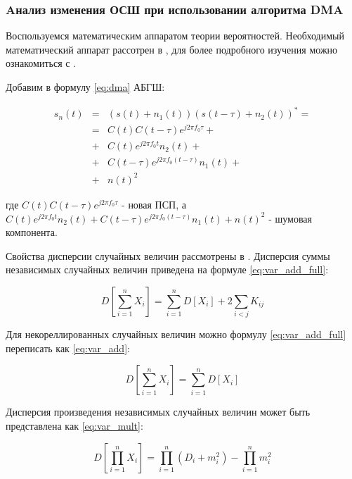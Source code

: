 \subsubsection{Aнализ изменения ОСШ при использовании алгоритма DMA}
\label{sssec:dma_noise}

Воспользуемся математическим аппаратом теории вероятностей. Необходимый математический аппарат
рассотрен в \cite{ventcel}, для более подробного изучения можно ознакомиться с \cite{feller}.

Добавим в формулу \ref{eq:dma} АБГШ:

\begin{center}
\begin{eqnarray}
	s_{n}(t) & = & (s(t)+n_{1}(t))(s(t-\tau)+n_{2}(t))^{*}=\nonumber \\
	 & = & C(t)C(t-\tau)e^{j2{\pi}f_{0}{\tau}}+\nonumber \\
	 & + & C(t)e^{j2{\pi}f_{0}t}n_{2}(t)+\label{eq:dma_noise_1}\\
	 & + & C(t-\tau)e^{j2{\pi}f_{0}(t-\tau)}n_{1}(t)+\nonumber \\
	 & + & n(t)^{2}\nonumber 
\end{eqnarray}
\end{center}

где
$C(t)C(t-\tau)e^{j2{\pi}f_{0}{\tau}}$ - новая ПСП, а
$C(t)e^{j2{\pi}f_{0}t}n_{2}(t)+C(t-\tau)e^{j2{\pi}f_{0}(t-\tau)}n_{1}(t) + n(t)^{2}$ -
шумовая компонента.

Свойства дисперсии случайных величин рассмотрены в \cite{ventcel}. Дисперсия суммы 
независимых случайных величин приведена на формуле \ref{eq:var_add_full}:

\begin{center}
\begin{equation}
	\label{eq:var_add_full}
	D[\sum\limits_{i=1}^{n}{X_i}]=\sum\limits_{i=1}^{n}{D[X_i]} + 2\sum\limits_{i<j}{K_{ij}}
\end{equation}
\end{center}

Для некореллированных случайных величин можно формулу \ref{eq:var_add_full} переписать как \ref{eq:var_add}:

\begin{center}
\begin{equation}
	\label{eq:var_add}
	D[\sum\limits_{i=1}^{n}{X_i}]=\sum\limits_{i=1}^{n}{D[X_i]}
\end{equation}
\end{center}

Дисперсия произведения независимых случайных величин может быть представлена как \ref{eq:var_mult}:
\begin{center}
\begin{equation}
	\label{eq:var_mult}
	D[\prod\limits_{i=1}^{n}{X_i}]=\prod\limits_{i=1}^{n}{(D_i + m_{i}^{2})} - \prod\limits_{i=1}^{n}{m_{i}^{2}}
\end{equation}
\end{center}

